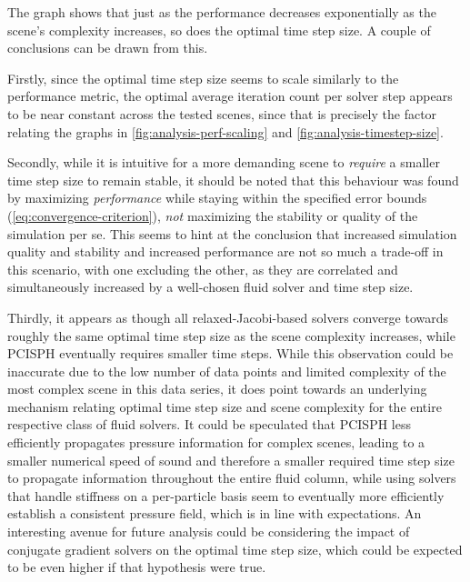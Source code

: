 \documentclass[oneside, a4paper]{book}
\begin{document}
  The graph shows that just as the performance decreases exponentially as the scene's complexity increases, so does the optimal time step size. A couple of conclusions can be drawn from this. 
  
  Firstly, since the optimal time step size seems to scale similarly to the performance metric, the optimal average iteration count per solver step appears to be near constant across the tested scenes, since that is precisely the factor relating the graphs in \autoref{fig:analysis-perf-scaling} and \autoref{fig:analysis-timestep-size}. 

  Secondly, while it is intuitive for a more demanding scene to \textit{require} a smaller time step size to remain stable, it should be noted that this behaviour was found by maximizing \textit{performance} while staying within the specified error bounds (\autoref{eq:convergence-criterion}), \textit{not} maximizing the stability or quality of the simulation per se. This seems to hint at the conclusion that increased simulation quality and stability and increased performance are not so much a trade-off in this scenario, with one excluding the other, as they are correlated and simultaneously increased by a well-chosen fluid solver and time step size.

  Thirdly, it appears as though all relaxed-Jacobi-based solvers converge towards roughly the same optimal time step size as the scene complexity increases, while PCISPH eventually requires smaller time steps. While this observation could be inaccurate due to the low number of data points and limited complexity of the most complex scene in this data series, it does point towards an underlying mechanism relating optimal time step size and scene complexity for the entire respective class of fluid solvers. It could be speculated that PCISPH less efficiently propagates pressure information for complex scenes, leading to a smaller numerical speed of sound and therefore a smaller required time step size to propagate information throughout the entire fluid column, while using solvers that handle stiffness on a per-particle basis seem to eventually more efficiently establish a consistent pressure field, which is in line with expectations. An interesting avenue for future analysis could be considering the impact of conjugate gradient solvers on the optimal time step size, which could be expected to be even higher if that hypothesis were true.

  
\end{document}
